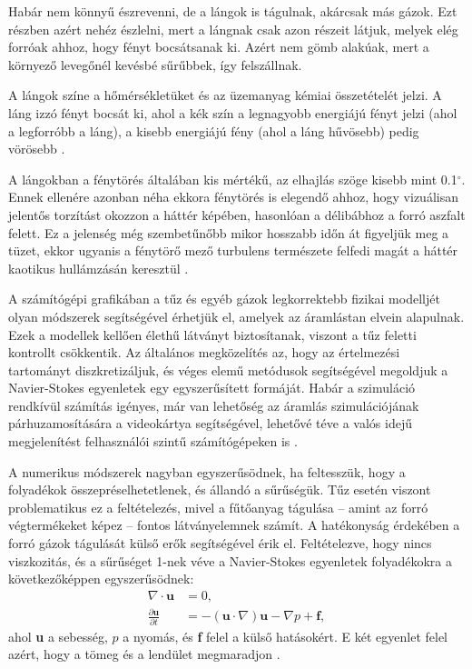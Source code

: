 Habár nem könnyű észrevenni, de a lángok is tágulnak, akárcsak más gázok. Ezt részben azért nehéz észlelni, mert a lángnak csak azon részeit látjuk, melyek elég forróak ahhoz, hogy fényt bocsátsanak ki. Azért nem gömb alakúak, mert a környező levegőnél kevésbé sűrűbbek, így felszállnak.

A lángok színe a hőmérsékletüket és az üzemanyag kémiai összetételét jelzi. A láng izzó fényt bocsát ki, ahol a kék szín a legnagyobb energiájú fényt jelzi (ahol a legforróbb a láng), a kisebb energiájú fény (ahol a láng hűvösebb) pedig vörösebb \cite{firePhysics1}.

A lángokban a fénytörés általában kis mértékű, az elhajlás szöge kisebb mint 0.1$^{\circ}$. Ennek ellenére azonban néha ekkora fénytörés is elegendő ahhoz, hogy vizuálisan jelentős torzítást okozzon a háttér képében, hasonlóan a délibábhoz a forró aszfalt felett. Ez a jelenség még szembetűnőbb mikor hosszabb időn át figyeljük meg a tüzet, ekkor ugyanis a fénytörő mező turbulens természete felfedi magát a háttér kaotikus hullámzásán keresztül \cite{swhThreeDimensionalReconst}.

A számítógépi grafikában a tűz és egyéb gázok legkorrektebb fizikai modelljét olyan módszerek segítségével érhetjük el, amelyek az áramlástan elvein alapulnak. Ezek a modellek kellően élethű látványt biztosítanak, viszont a tűz feletti kontrollt csökkentik. Az általános megközelítés az, hogy az értelmezési tartományt diszkretizáljuk, és véges elemű metódusok segítségével megoldjuk a Navier-Stokes egyenletek egy egyszerűsített formáját. Habár a szimuláció rendkívül számítás igényes, már van lehetőség az áramlás szimulációjának párhuzamosítására a videokártya segítségével, lehetővé téve a valós idejű megjelenítést felhasználói szintű számítógépeken is \cite{texturedForces, swhThreeDimensionalReconst}.

A numerikus módszerek nagyban egyszerűsödnek, ha feltesszük, hogy a folyadékok összepréselhetetlenek, és állandó a sűrűségük. Tűz esetén viszont problematikus ez a feltételezés, mivel a fűtőanyag tágulása -- amint az forró végtermékeket képez -- fontos látványelemnek számít. A hatékonyság érdekében a forró gázok tágulását külső erők segítségével érik el. Feltételezve, hogy nincs viszkozitás, és a sűrűséget 1-nek véve a Navier-Stokes egyenletek folyadékokra a következőképpen egyszerűsödnek:
\begin{align*}
\nabla \cdot \textbf{u} &= 0, \\
\frac{\partial \textbf{u}}{\partial t} &= -(\textbf{u} \cdot \nabla)\textbf{u} - \nabla \textit{p} + \textbf{f} , 
\end{align*}
ahol \textbf{u} a sebesség, $p$ a nyomás, és \textbf{f} felel a külső hatásokért. E két egyenlet felel azért, hogy a tömeg és a lendület megmaradjon 
\cite{swhThreeDimensionalReconst}.

